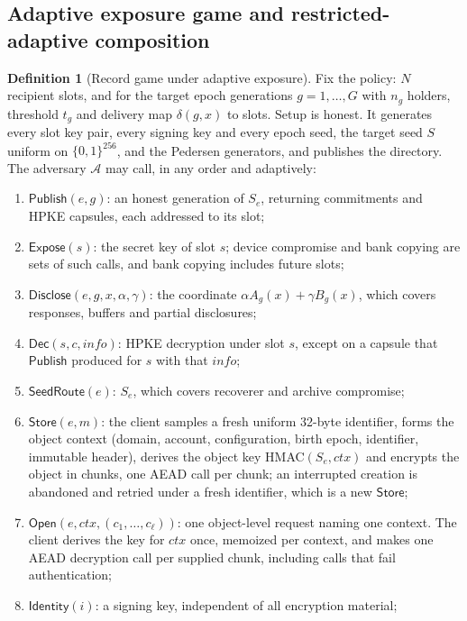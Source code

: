 \documentclass[pdflatex,sn-mathphys-num]{sn-jnl}%
\theoremstyle{plain}
\theoremstyle{definition}
\newtheorem{definition}[theorem]{Definition}
\begin{document}
\subsection{Adaptive exposure game and restricted-adaptive composition}\label{sec:adaptive}
\begin{definition}[Record game under adaptive exposure]\label{def:adaptivegame}
Fix the policy: $N$ recipient slots, and for the target epoch generations $g=1,\dots,G$ with $n_g$ holders, threshold $t_g$ and delivery map $\delta(g,x)$ to slots. Setup is honest. It generates every slot key pair, every signing key and every epoch seed, the target seed $S$ uniform on $\{0,1\}^{256}$, and the Pedersen generators, and publishes the directory. The adversary $\mathcal A$ may call, in any order and adaptively:
\begin{enumerate}
\item $\mathsf{Publish}(e,g)$: an honest generation of $S_e$, returning commitments and HPKE capsules, each addressed to its slot;
\item $\mathsf{Expose}(s)$: the secret key of slot $s$; device compromise and bank copying are sets of such calls, and bank copying includes future slots;
\item $\mathsf{Disclose}(e,g,x,\alpha,\gamma)$: the coordinate $\alpha A_g(x)+\gamma B_g(x)$, which covers responses, buffers and partial disclosures;
\item $\mathsf{Dec}(s,c,\mathit{info})$: HPKE decryption under slot $s$, except on a capsule that $\mathsf{Publish}$ produced for $s$ with that $\mathit{info}$;
\item $\mathsf{SeedRoute}(e)$: $S_e$, which covers recoverer and archive compromise;
\item $\mathsf{Store}(e,m)$: the client samples a fresh uniform 32-byte identifier, forms the object context (domain, account, configuration, birth epoch, identifier, immutable header), derives the object key HMAC$(S_e,\mathit{ctx})$ and encrypts the object in chunks, one AEAD call per chunk; an interrupted creation is abandoned and retried under a fresh identifier, which is a new $\mathsf{Store}$;
\item $\mathsf{Open}(e,\mathit{ctx},(c_1,\dots,c_\ell))$: one object-level request naming one context. The client derives the key for $\mathit{ctx}$ once, memoized per context, and makes one AEAD decryption call per supplied chunk, including calls that fail authentication;
\item $\mathsf{Identity}(i)$: a signing key, independent of all encryption material;

\end{enumerate}
\end{definition}
\end{document}
